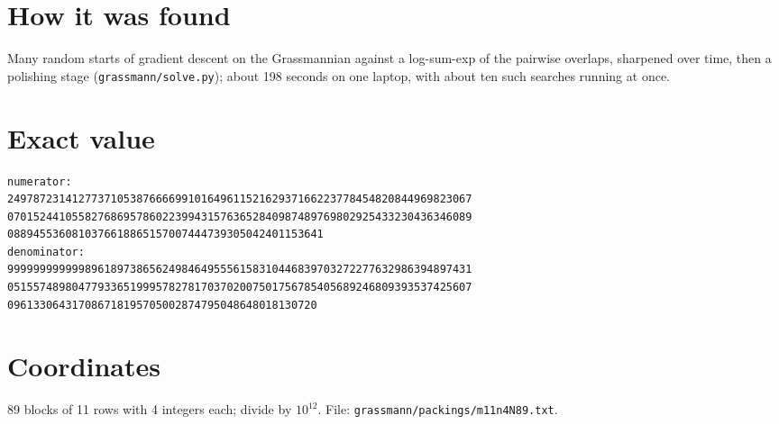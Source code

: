 \documentclass[11pt,a4paper]{article}
\begin{document}
\section{How it was found}
Many random starts of gradient descent on the Grassmannian against a log-sum-exp of the pairwise overlaps, sharpened over time, then a polishing stage (\texttt{grassmann/solve.py}); about 198 seconds on one laptop, with about ten such searches running at once.


\appendix
\section{Exact value}
{\small
\begin{verbatim}
numerator:
249787231412773710538766669910164961152162937166223778454820844969823067
070152441055827686957860223994315763652840987489769802925433230436346089
0889455360810376618865157007444739305042401153641
denominator:
999999999999896189738656249846495556158310446839703272277632986394897431
051557489804779336519995782781703702007501756785405689246809393537425607
096133064317086718195705002874795048648018130720
\end{verbatim}}

\section{Coordinates}
89 blocks of 11 rows with 4 integers each; divide by $10^{12}$. File: \texttt{grassmann/packings/m11n4N89.txt}.
{\tiny
\begin{multicols}{3}
\end{multicols}}
\end{document}
